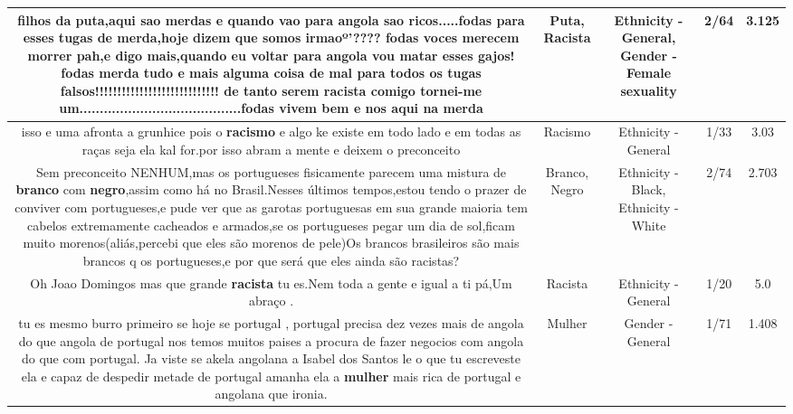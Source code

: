 \documentclass[11pt]{article}
\newlength\mylength
\begin{document}
\begin{center}
\begin{longtable}{|C{.65\mylength}|C{.30\mylength}|C{.12\mylength}|C{.12\mylength}|C{.12\mylength}|}
  \small filhos da \textbf{puta},aqui sao merdas e quando vao para angola sao ricos.....fodas para esses tugas de merda,hoje dizem que somos irmaoº'???? fodas voces merecem morrer pah,e digo mais,quando eu voltar para angola vou matar esses gajos! fodas merda tudo e mais alguma coisa de mal para todos os tugas falsos!!!!!!!!!!!!!!!!!!!!!!!!!!!! de tanto serem \textbf{racista} comigo tornei-me um........................................fodas vivem bem e nos aqui na merda\normalsize   & Puta, Racista & Ethnicity - General, Gender - Female sexuality & 2/64 & 3.125 \\  \hline
  \small isso e uma afronta a grunhice pois o \textbf{racismo} e algo ke existe em todo lado e em todas as raças seja ela kal for.por isso abram a mente e deixem o preconceito\normalsize   & Racismo & Ethnicity - General & 1/33 & 3.03 \\  \hline
  \small Sem preconceito NENHUM,mas os portugueses fisicamente parecem uma mistura de \textbf{branco} com \textbf{negro},assim como há no Brasil.Nesses últimos tempos,estou tendo o prazer de conviver com portugueses,e pude ver que as garotas portuguesas em sua grande maioria tem cabelos extremamente cacheados e armados,se os portugueses pegar um dia de sol,ficam muito morenos(aliás,percebi que eles são morenos de pele)Os brancos brasileiros são mais brancos q os portugueses,e por que será  que eles ainda são racistas?\normalsize   & Branco, Negro & Ethnicity - Black, Ethnicity - White & 2/74 & 2.703 \\  \hline
  \small Oh Joao Domingos mas que grande \textbf{racista} tu es.Nem toda a gente e igual a ti pá,Um abraço .\normalsize   & Racista & Ethnicity - General & 1/20 & 5.0 \\  \hline
  \small tu es mesmo burro primeiro se hoje se portugal , portugal precisa dez vezes mais de angola do que angola de portugal nos temos muitos paises a procura de fazer negocios com angola do que com portugal. Ja viste se akela angolana a Isabel dos Santos le o que tu escreveste ela e capaz de despedir metade de portugal amanha ela a \textbf{mulher} mais rica de portugal e angolana que ironia.\normalsize   & Mulher & Gender - General & 1/71 & 1.408 \\  \hline

\end{longtable}
\end{center}
\end{document}
